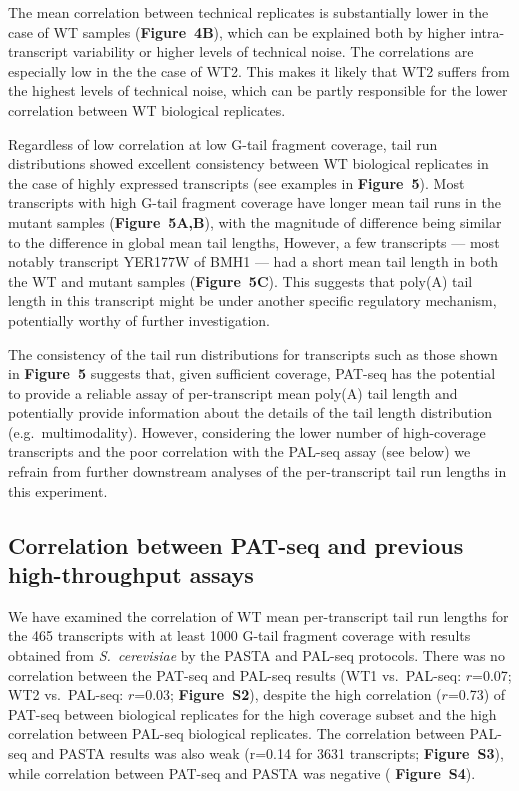 \documentclass[10pt]{article}
\begin{document}
The mean correlation between technical replicates is substantially lower in the case of WT samples (\textbf{Figure~4B}), which can be explained both by higher intra-transcript variability or higher levels of technical noise. The correlations are especially low in the the case of WT2. This makes it likely that WT2 suffers from the highest levels of technical noise, which can be partly responsible for the lower correlation between WT biological replicates.

Regardless of low correlation at low G-tail fragment coverage, tail run distributions showed excellent consistency between WT biological replicates in the case of highly expressed transcripts (see examples in \textbf{Figure~5}). Most transcripts with high G-tail fragment coverage have longer mean tail runs in the mutant samples (\textbf{Figure~5A,B}), with the magnitude of difference being similar to the difference in global mean tail lengths, However, a few transcripts --- most notably transcript YER177W of BMH1 --- had a short mean tail length in both the WT and mutant samples (\textbf{Figure~5C}). This suggests that poly(A) tail length in this transcript might be under another specific regulatory mechanism, potentially worthy of further investigation.

The consistency of the tail run distributions for transcripts such as those shown in \textbf{Figure~5} suggests that, given sufficient coverage, PAT-seq has the potential to provide a reliable assay of per-transcript mean poly(A) tail length and potentially provide information about the details of the tail length distribution (e.g.~multimodality). However, considering the lower number of high-coverage transcripts and the poor correlation with the PAL-seq assay (see below) we refrain from further downstream analyses of the per-transcript tail run lengths in this experiment.

\subsection*{Correlation between PAT-seq and previous high-throughput assays}

We have examined the correlation of WT mean per-transcript tail run lengths for the 465 transcripts with at least 1000 G-tail fragment coverage with results obtained from \textit{S.~cerevisiae} by the PASTA \cite{beilharz07} and PAL-seq \cite{subtelny14} protocols. There was no correlation between the PAT-seq and PAL-seq results (WT1 vs.\ PAL-seq: $r$=0.07; WT2 vs.\ PAL-seq: $r$=0.03; \textbf{Figure~S2}), despite the high correlation ($r$=0.73) of PAT-seq between biological replicates for the high coverage subset and the high correlation between PAL-seq biological replicates. The correlation between PAL-seq and PASTA results was also weak (r=0.14 for 3631 transcripts; \textbf{Figure~S3}), while correlation between PAT-seq and PASTA was negative ( \textbf{Figure~S4}).
\end{document}

